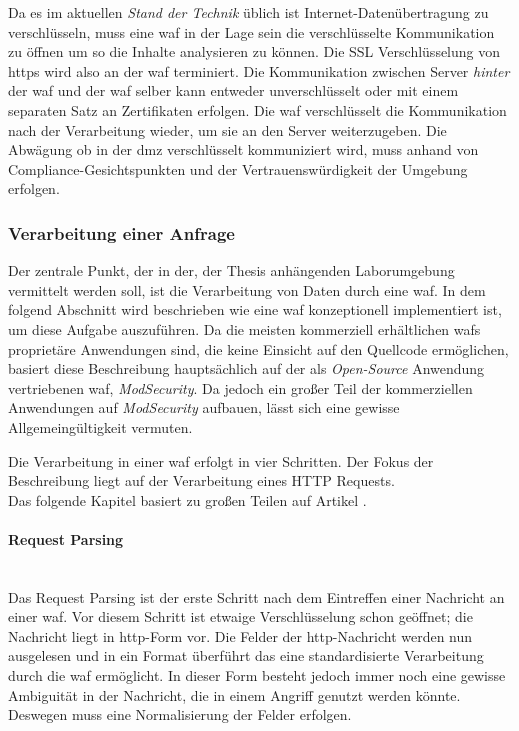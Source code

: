 Da es im aktuellen \textit{Stand der Technik} üblich ist Internet-Datenübertragung zu verschlüsseln, muss eine \ac{waf} in der Lage sein die verschlüsselte Kommunikation zu öffnen um so die Inhalte analysieren zu können. %
Die SSL Verschlüsselung von \ac{https} wird also an der \ac{waf} terminiert.
Die Kommunikation zwischen Server \textit{hinter} der \ac{waf} und der \ac{waf} selber kann entweder unverschlüsselt oder mit einem separaten Satz an Zertifikaten erfolgen.
Die \ac{waf} verschlüsselt die Kommunikation nach der Verarbeitung wieder, um sie an den Server weiterzugeben.
Die Abwägung ob in der \ac{dmz} verschlüsselt kommuniziert wird, muss anhand von Compliance-Gesichtspunkten und der Vertrauenswürdigkeit der Umgebung erfolgen\cite{guptaWEBAPPLICATIONFIREWALL2007}.%

\subsubsection{Verarbeitung einer Anfrage}
Der zentrale Punkt, der in der, der Thesis anhängenden Laborumgebung vermittelt werden soll, ist die Verarbeitung von Daten durch eine \ac{waf}.
In dem folgend Abschnitt wird beschrieben wie eine \ac{waf} konzeptionell implementiert ist, um diese Aufgabe auszuführen.
Da die meisten kommerziell erhältlichen \acp{waf} proprietäre Anwendungen sind, die keine Einsicht auf den Quellcode ermöglichen, basiert diese Beschreibung hauptsächlich auf der als \textit{Open-Source} Anwendung vertriebenen \ac{waf}, \textit{ModSecurity}.
Da jedoch ein großer Teil der kommerziellen Anwendungen auf \textit{ModSecurity} aufbauen, lässt sich eine gewisse Allgemeingültigkeit vermuten.

Die Verarbeitung in einer \ac{waf} erfolgt in vier Schritten. 
Der Fokus der Beschreibung liegt auf der Verarbeitung eines HTTP Requests.\\

Das folgende Kapitel basiert zu großen Teilen auf Artikel \cite{yuanResearchImplementationWEB2019}.

\paragraph{Request Parsing}\ \\
Das Request Parsing ist der erste Schritt nach dem Eintreffen einer Nachricht an einer \ac{waf}.
Vor diesem Schritt ist etwaige Verschlüsselung schon geöffnet; die Nachricht liegt in \ac{http}-Form vor.
Die Felder der \ac{http}-Nachricht werden nun ausgelesen und in ein Format überführt das eine standardisierte Verarbeitung durch die \ac{waf} ermöglicht.
In dieser Form besteht jedoch immer noch eine gewisse Ambiguität in der Nachricht, die in einem Angriff genutzt werden könnte.
Deswegen muss eine Normalisierung der Felder erfolgen.

